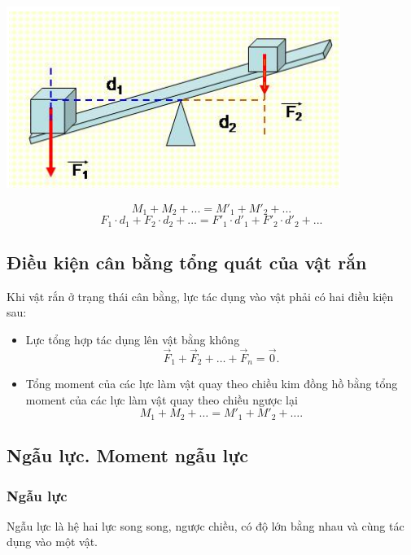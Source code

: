 \begin{center}
	\includegraphics[scale=0.5]{../figs/VN10-PH-21-L-016-2-V2-01.png}
\end{center}
\begin{equation*}
	M_1+M_2+... = M'_1+M'_2+... 
\end{equation*}
%
\begin{equation*}
	F_1\cdot d_1+F_2\cdot d_2 + ... = F'_1\cdot d'_1 + F'_2\cdot d'_2+...
\end{equation*}
\subsection{Điều kiện cân bằng tổng quát của vật rắn}
Khi vật rắn ở trạng thái cân bằng, lực tác dụng vào vật phải có hai điều kiện sau:
\begin{itemize}
	\item Lực tổng hợp tác dụng lên vật bằng không
	$$\vec{F}_1+\vec{F}_2+\dots+\vec{F}_n=\vec{0}.$$
	\item Tổng moment của các lực làm vật quay theo chiều kim đồng hồ bằng tổng moment của các lực làm vật quay theo chiều ngược lại
	$$M_1+M_2+\dots=M'_1+M'_2+\dots.$$
\end{itemize}
\subsection{Ngẫu lực. Moment ngẫu lực}
\subsubsection{Ngẫu lực}
Ngẫu lực là hệ hai lực song song, ngược chiều, có độ lớn bằng nhau và cùng tác dụng vào một vật.
